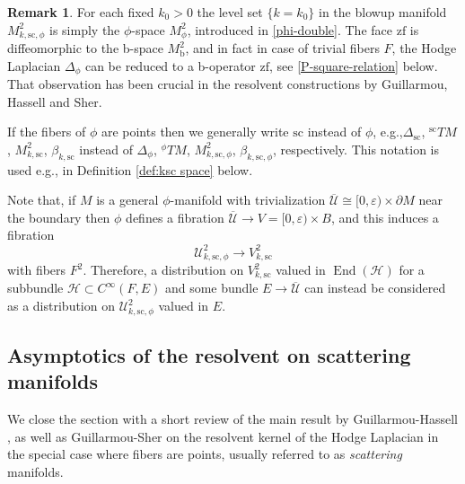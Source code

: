 \documentclass[11pt]{article}
\newcommand{\eg}{e.g.,\xspace}
\numberwithin{equation}{section}
\theoremstyle{plain}
\theoremstyle{definition}
\newtheorem{Rem}[Th]{Remark}
\newcommand{\Umath}{{\mathscr{U}}}
\newcommand{\Umathbar}{{\overline{\mathscr{U}}}}
\newcommand{\Hmath}{{\mathscr{H}}}
\newcommand{\ssc}{{\mathrm{sc}}}
\newcommand{\zf}{{\mathrm{zf}}}
\DeclareMathOperator{\End}{End}
\newcommand{\Cinf}{C^\infty}
\newcommand{\dM}{{\partial M}}
\newcommand{\phiT}{{}^\phi T}
\newcommand{\scT}{{}^{\mathrm{sc}}T}
\let\eps\varepsilon
\begin{document}
\begin{Rem}
For each fixed $k_0> 0$ the level set $\{k=k_0\}$ in the blowup
manifold $M^{2}_{k, \ssc,\phi}$ is simply the $\phi$-space
$M_\phi^2$, introduced in \eqref{phi-double}. The face $\zf$ is diffeomorphic to
the b-space $M^{2}_\text{b}$, and in fact in case of trivial
fibers $F$, the Hodge Laplacian $\Delta_{\phi}$ can be reduced to a
b-operator $\zf$, see \eqref{P-square-relation} below. That observation has been crucial in
the resolvent constructions by Guillarmou, Hassell and Sher.
\end{Rem}

If the fibers of $\phi$ are points then we generally write $\ssc$ instead of $\phi$, \eg $\Delta_{\ssc}$, $\scT M$, $M^2_{k,\ssc}$,
$\beta_{k, \ssc}$ instead of $\Delta_\phi$, $\phiT M$, $M^2_{k,\ssc,\phi}$, $\beta_{k, \ssc,\phi}$, respectively. This
notation is used \eg in Definition \ref{def:ksc space} below.

Note that, if $M$ is a general $\phi$-manifold with trivialization $\Umathbar\cong[0,\eps)\times\dM$
near the boundary then $\phi$ defines a fibration $\Umathbar\to V=[0,\eps)\times B$, and this induces a fibration
\begin{equation}
\label{eqn:F2 fibration}
\Umath^2_{k,\ssc,\phi} \to V^2_{k,\ssc}
\end{equation}
with fibers $F^2$. Therefore, a distribution on $V^2_{k,\ssc}$ valued in $\End(\Hmath)$ for a
subbundle $\Hmath\subset \Cinf(F,E)$ and some bundle $E\to\Umathbar$ can instead be considered as a distribution on $\Umath^2_{k,\ssc,\phi}$ valued in $E$.

\subsection{Asymptotics of the resolvent on scattering manifolds} \label{section 4.4}
We close the section with a short review of the main
result by Guillarmou-Hassell \cite{guillarmou2008resolvent}, as well as
Guillarmou-Sher \cite{guillarmou2014low} on the resolvent
kernel of the Hodge Laplacian in the special case where fibers are points, usually referred to as
\emph{scattering} manifolds.
\end{document}
